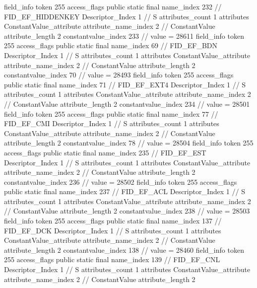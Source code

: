 {{{{{			}
			field_info {
				token	255
				access_flags	public static final
				name_index	232		// FID_EF_HIDDENKEY
				Descriptor_Index	1		// S
				attributes_count	1
				attributes {
				ConstantValue_attribute {
					attribute_name_index	2		// ConstantValue
					attribute_length	2
					constantvalue_index	233		// value = 28611
				}
				}
			}
			field_info {
				token	255
				access_flags	public static final
				name_index	69		// FID_EF_BDN
				Descriptor_Index	1		// S
				attributes_count	1
				attributes {
				ConstantValue_attribute {
					attribute_name_index	2		// ConstantValue
					attribute_length	2
					constantvalue_index	70		// value = 28493
				}
				}
			}
			field_info {
				token	255
				access_flags	public static final
				name_index	71		// FID_EF_EXT4
				Descriptor_Index	1		// S
				attributes_count	1
				attributes {
				ConstantValue_attribute {
					attribute_name_index	2		// ConstantValue
					attribute_length	2
					constantvalue_index	234		// value = 28501
				}
				}
			}
			field_info {
				token	255
				access_flags	public static final
				name_index	77		// FID_EF_CMI
				Descriptor_Index	1		// S
				attributes_count	1
				attributes {
				ConstantValue_attribute {
					attribute_name_index	2		// ConstantValue
					attribute_length	2
					constantvalue_index	78		// value = 28504
				}
				}
			}
			field_info {
				token	255
				access_flags	public static final
				name_index	235		// FID_EF_EST
				Descriptor_Index	1		// S
				attributes_count	1
				attributes {
				ConstantValue_attribute {
					attribute_name_index	2		// ConstantValue
					attribute_length	2
					constantvalue_index	236		// value = 28502
				}
				}
			}
			field_info {
				token	255
				access_flags	public static final
				name_index	237		// FID_EF_ACL
				Descriptor_Index	1		// S
				attributes_count	1
				attributes {
				ConstantValue_attribute {
					attribute_name_index	2		// ConstantValue
					attribute_length	2
					constantvalue_index	238		// value = 28503
				}
				}
			}
			field_info {
				token	255
				access_flags	public static final
				name_index	137		// FID_EF_DCK
				Descriptor_Index	1		// S
				attributes_count	1
				attributes {
				ConstantValue_attribute {
					attribute_name_index	2		// ConstantValue
					attribute_length	2
					constantvalue_index	138		// value = 28460
				}
				}
			}
			field_info {
				token	255
				access_flags	public static final
				name_index	139		// FID_EF_CNL
				Descriptor_Index	1		// S
				attributes_count	1
				attributes {
				ConstantValue_attribute {
					attribute_name_index	2		// ConstantValue
					attribute_length	2
}}}}}}}
